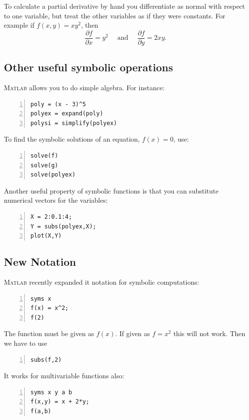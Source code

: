To calculate a partial derivative by hand you differentiate as normal with respect to one variable, but
treat the other variables as if they were constants. For example if  $f(x,y) = x y^2$, then 
 $$
 \frac{\partial f}{ \partial x} = y^2 \quad \text{ and } \quad \frac{\partial f}{ \partial y} = 2 xy.
$$

\subsection*{Other useful symbolic operations}

\textsc{Matlab} allows you to do simple algebra. For instance:
\begin{lstlisting}[frame=none,numbers=left]
poly = (x - 3)^5
polyex = expand(poly)
polysi = simplify(polyex)
\end{lstlisting}
To find the symbolic solutions of an equation, $f(x) = 0$,
use:
\begin{lstlisting}[frame=none,numbers=left]
solve(f)
solve(g)
solve(polyex)
\end{lstlisting}
Another useful property of symbolic functions is that
you can substitute numerical vectors for the variables:
\begin{lstlisting}[frame=none,numbers=left]
X = 2:0.1:4;
Y = subs(polyex,X);
plot(X,Y)
\end{lstlisting}

\subsection*{New Notation}

\textsc{Matlab} recently expanded it notation for symbolic computations:
\begin{lstlisting}[frame=none,numbers=left]
syms x
f(x) = x^2;
f(2)
\end{lstlisting}
The function must be given as $f(x)$. If given as $f = x^2$ this will not work. Then we have to use 
\begin{lstlisting}[frame=none,numbers=left]
subs(f,2)
\end{lstlisting}
It works for multivariable functions also:
\begin{lstlisting}[frame=none,numbers=left]
syms x y a b
f(x,y) = x + 2*y;
f(a,b)
\end{lstlisting}

\newpage
